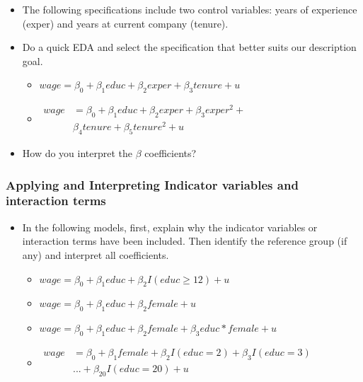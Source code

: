 \documentclass[
]{book}
\theoremstyle{definition}
\theoremstyle{definition}
\theoremstyle{definition}
\theoremstyle{definition}
\theoremstyle{remark}
\begin{document}
\begin{itemize}
\item
  The following specifications include two control variables: years of experience (exper) and years at current company (tenure).
\item
  Do a quick EDA and select the specification that better suits our description goal.

  \begin{itemize}
  \item
    \(wage = \beta_0 + \beta_1 educ + \beta_2 exper + \beta_3 tenure + u\)
  \item
    \(\begin{aligned} wage &= \beta_0 + \beta_1 educ + \beta_2 exper + \beta_3 exper^2 + \\ & \beta_4 tenure + \beta_5 tenure^2 + u \end{aligned}\)
  \end{itemize}
\item
  How do you interpret the \(\beta\) coefficients?
\end{itemize}

\hypertarget{applying-and-interpreting-indicator-variables-and-interaction-terms}{%
\subsubsection{Applying and Interpreting Indicator variables and interaction terms}\label{applying-and-interpreting-indicator-variables-and-interaction-terms}}

\begin{itemize}
\item
  In the following models, first, explain why the indicator variables or interaction terms have been included. Then identify the reference group (if any) and interpret all coefficients.

  \begin{itemize}
  \item
    \(wage = \beta_0 + \beta_1 educ + \beta_2 I(educ \geq 12) + u\)
  \item
    \(wage = \beta_0 + \beta_1 educ + \beta_2 female + u\)
  \item
    \(wage = \beta_0 + \beta_1 educ + \beta_2 female + \beta_3 educ*female + u\)
  \item
    \(\begin{aligned} wage &= \beta_0 + \beta_1 female + \beta_2 I(educ = 2) + \beta_3 I(educ = 3)\\ &...+ \beta_{20} I(educ = 20) + u\\ \end{aligned}\)
  \end{itemize}
\end{itemize}
\end{document}

